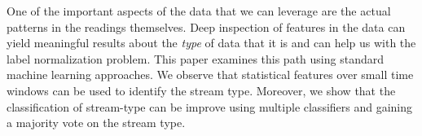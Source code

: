 One of the important aspects of the data that we can leverage are the actual patterns in the readings themselves.
Deep inspection of features in the data can yield meaningful results about the \emph{type} of data that it is
and can help us with the label normalization problem.  This paper examines this path using standard machine learning
approaches.  We observe that statistical features over small time windows can be used to identify the stream type.
Moreover, we show that the classification of stream-type can be improve using multiple classifiers and 
gaining a majority vote on the stream type.




